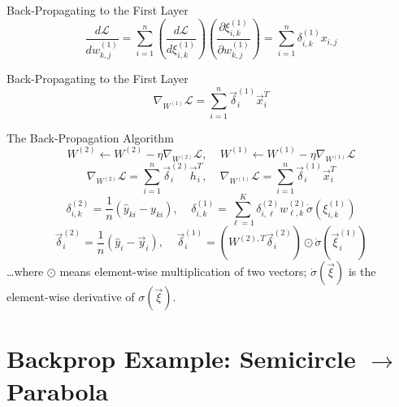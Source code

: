 \documentclass{beamer}
\begin{document}
\begin{frame}
  \begin{small}\end{small}
  \begin{block}{Back-Propagating to the First Layer}    
    \[
    \frac{d{\mathcal L}}{d w_{k,j}^{(1)}} =
    \sum_{i=1}^n
    \left(\frac{d{\mathcal L}}{d\xi_{i,k}^{(1)}}\right)
    \left(\frac{\partial \xi_{i,k}^{(1)}}{\partial w_{k,j}^{(1)}}\right)
    = \sum_{i=1}^n \delta^{(1)}_{i,k}x_{i,j}
    \]
  \end{block}
\end{frame}

\begin{frame}
  \begin{small}\end{small}
  \begin{block}{Back-Propagating to the First Layer}    
    \[
    \nabla_{W^{(1)}}{\mathcal L} = 
    \sum_{i=1}^n\vec\delta_i^{(1)}\vec{x}_i^T
    \]
  \end{block}
\end{frame}

\begin{frame}
  \begin{block}{The Back-Propagation Algorithm}
    \[
    W^{(2)}\leftarrow W^{(2)}-\eta\nabla_{W^{(2)}}{\mathcal L},~~~~~
    W^{(1)}\leftarrow W^{(1)}-\eta\nabla_{W^{(1)}}{\mathcal L}
    \]
    \[
    \nabla_{W^{(2)}}{\mathcal L}=\sum_{i=1}^n \vec\delta^{(2)}_i\vec{h}_i^T,~~~~~
    \nabla_{W^{(1)}}{\mathcal L}=\sum_{i=1}^n\vec\delta^{(1)}_i\vec{x}_i^T
    \]
    \[
    \delta^{(2)}_{i,k}=\frac{1}{n} (\hat{y}_{ki}-y_{ki}),~~~~~
    \delta^{(1)}_{i,k}=\sum_{\ell=1}^K \delta^{(2)}_{i,\ell}w_{\ell, k}^{(2)}\dot\sigma(\xi_{i,k}^{(1)})
    \]
    \[
    \vec\delta^{(2)}_i=\frac{1}{n}\left(\hat{y}_i-\vec{y}_i\right),~~~~~
    \vec\delta^{(1)}_i=\left(W^{(2),T}\vec\delta^{(2)}_i\right)\odot \dot\sigma(\vec\xi_i^{(1)})
    \]
    \ldots where $\odot$ means element-wise multiplication of two
    vectors; $\dot\sigma(\vec\xi)$ is the element-wise
    derivative of $\sigma(\vec\xi)$.
  \end{block}
\end{frame}

\section[Backprop Example]{Backprop Example: Semicircle $\rightarrow$ Parabola}
\setcounter{subsection}{1}
\end{document}
